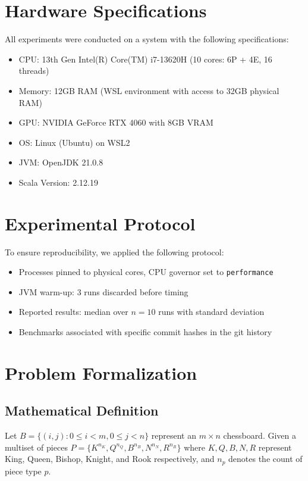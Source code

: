\documentclass[12pt,a4paper]{article}
\theoremstyle{definition}
\begin{document}
\section{Hardware Specifications}

All experiments were conducted on a system with the following specifications:
\begin{itemize}
    \item CPU: 13th Gen Intel(R) Core(TM) i7-13620H (10 cores: 6P + 4E, 16 threads)
    \item Memory: 12GB RAM (WSL environment with access to 32GB physical RAM)
    \item GPU: NVIDIA GeForce RTX 4060 with 8GB VRAM
    \item OS: Linux (Ubuntu) on WSL2
    \item JVM: OpenJDK 21.0.8
    \item Scala Version: 2.12.19
\end{itemize}

\section{Experimental Protocol}

To ensure reproducibility, we applied the following protocol:
\begin{itemize}
    \item Processes pinned to physical cores, CPU governor set to \texttt{performance}
    \item JVM warm-up: 3 runs discarded before timing
    \item Reported results: median over $n=10$ runs with standard deviation
    \item Benchmarks associated with specific commit hashes in the git history
\end{itemize}

\section{Problem Formalization}

\subsection{Mathematical Definition}

Let $B = \{(i,j) : 0 \leq i < m, 0 \leq j < n\}$ represent an $m \times n$ chessboard. Given a multiset of pieces $P = \{K^{n_K}, Q^{n_Q}, B^{n_B}, N^{n_N}, R^{n_R}\}$ where $K, Q, B, N, R$ represent King, Queen, Bishop, Knight, and Rook respectively, and $n_p$ denotes the count of piece type $p$.
\end{document}
